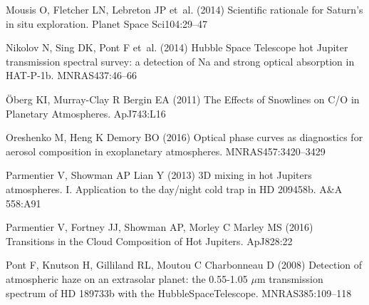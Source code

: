 \documentclass[graybox,natbib,nosecnum]{svmult}
\newcommand*\aap{A\&A}
\newcommand*\apj{ApJ}
\newcommand*\apjl{ApJ}
\newcommand*\mnras{MNRAS}
\newcommand*\planss{Planet Space Sci}
\begin{document}
\begin{thebibliography}{110}
{Mousis} O, {Fletcher} LN, {Lebreton} JP et~al. (2014) {Scientific rationale
  for Saturn's in situ exploration}. \planss 104:29--47

{Nikolov} N, {Sing} DK, {Pont} F et~al. (2014) {Hubble Space Telescope hot
  Jupiter transmission spectral survey: a detection of Na and strong optical
  absorption in HAT-P-1b}. \mnras 437:46--66

{{\"O}berg} KI, {Murray-Clay} R {Bergin} EA (2011) {The Effects of Snowlines on
  C/O in Planetary Atmospheres}. \apjl 743:L16

{Oreshenko} M, {Heng} K {Demory} BO (2016) {Optical phase curves as diagnostics
  for aerosol composition in exoplanetary atmospheres}. \mnras 457:3420--3429

{Parmentier} V, {Showman} AP {Lian} Y (2013) {3D mixing in hot Jupiters
  atmospheres. I. Application to the day/night cold trap in HD 209458b}. \aap
  558:A91

{Parmentier} V, {Fortney} JJ, {Showman} AP, {Morley} C {Marley} MS (2016)
  {Transitions in the Cloud Composition of Hot Jupiters}. \apj 828:22

{Pont} F, {Knutson} H, {Gilliland} RL, {Moutou} C {Charbonneau} D (2008)
  {Detection of atmospheric haze on an extrasolar planet: the 0.55-1.05
  {$\mu$}m transmission spectrum of HD 189733b with the HubbleSpaceTelescope}.
  \mnras 385:109--118


\end{thebibliography}
\end{document}
